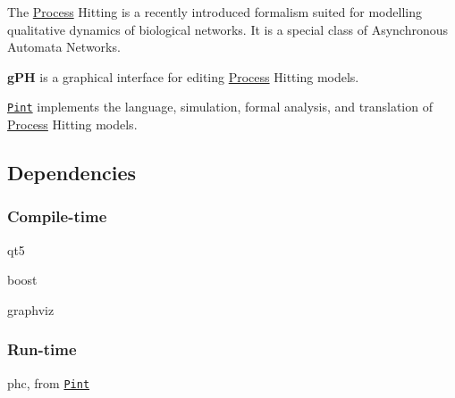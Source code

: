 The \hyperlink{classProcess}{Process} Hitting is a recently introduced formalism suited for modelling qualitative dynamics of biological networks. It is a special class of Asynchronous Automata Networks.

{\bfseries g\+P\+H} is a graphical interface for editing \hyperlink{classProcess}{Process} Hitting models.

\href{https://github.com/pauleve/pint/}{\tt Pint} implements the language, simulation, formal analysis, and translation of \hyperlink{classProcess}{Process} Hitting models.



\subsection*{Dependencies}

\subsubsection*{Compile-\/time}


\begin{DoxyItemize}
\item qt5
\item boost
\item graphviz
\end{DoxyItemize}

\subsubsection*{Run-\/time}


\begin{DoxyItemize}
\item phc, from \href{https://github.com/pauleve/pint/}{\tt Pint} 
\end{DoxyItemize}